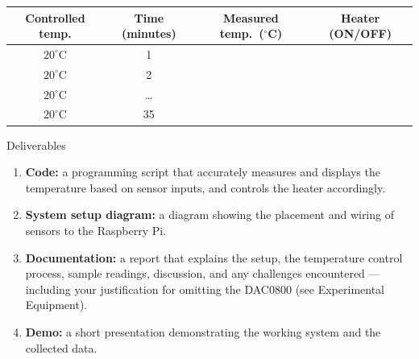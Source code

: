 \begin{procedure}
  \needspace{4cm}
  \begin{boxedtable}
    \label{tab:exp8rpi-results}
    \centering
    \begin{tabular}{cccc}
      \toprule
      Controlled temp. & Time (minutes) & Measured temp.\ ($^\circ$C) & Heater (ON/OFF) \\
      \midrule
      $20^\circ$C      & 1               &                              &                  \\
      $20^\circ$C      & 2               &                              &                  \\
      $20^\circ$C      & \ldots          &                              &                  \\
      $20^\circ$C      & 35              &                              &                  \\
      \bottomrule
    \end{tabular}
  \end{boxedtable}
\end{procedure}

\begin{labsection}{Deliverables}
  \begin{enumerate}
    \item \textbf{Code:} a programming script that accurately measures and displays the temperature based on sensor inputs, and controls the heater accordingly.
    \item \textbf{System setup diagram:} a diagram showing the placement and wiring of sensors to the Raspberry Pi.
    \item \textbf{Documentation:} a report that explains the setup, the temperature control process, sample readings, discussion, and any challenges encountered --- including your justification for omitting the DAC0800 (see Experimental Equipment).
    \item \textbf{Demo:} a short presentation demonstrating the working system and the collected data.
  \end{enumerate}
\end{labsection}

